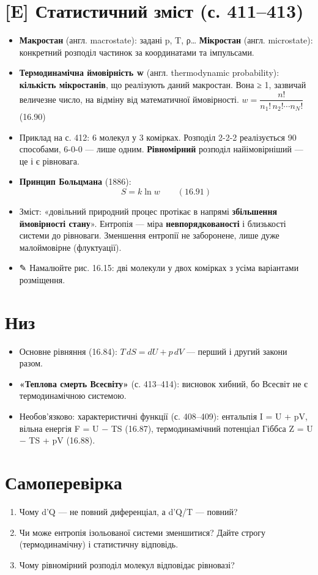 \documentclass[11pt,a4paper,oneside]{book}
\newcommand{\pen}{{\sffamily\color{accent}✎}}
\begin{document}
\section*{[E] Статистичний зміст (с. 411–413)}
\begin{itemize}
\item \textbf{Макростан} (англ. macrostate): задані p, T, ρ… \textbf{Мікростан} (англ. microstate): конкретний розподіл частинок за координатами та імпульсами.
\item \textbf{Термодинамічна ймовірність w} (англ. thermodynamic probability): \textbf{кількість мікростанів}, що реалізують даний макростан. Вона ≥ 1, зазвичай величезне число, на відміну від математичної ймовірності. $w = \dfrac{n!}{n_1!\,n_2!\cdots n_N!}$ (16.90)
\item Приклад на с. 412: 6 молекул у 3 комірках. Розподіл 2-2-2 реалізується 90 способами, 6-0-0 — лише одним. \textbf{Рівномірний} розподіл найімовірніший — це і є рівновага.
\item \textbf{Принцип Больцмана} (1886):
\[S = k\ln w\qquad(16.91)\]
\item Зміст: «довільний природний процес протікає в напрямі \textbf{збільшення ймовірності стану}». Ентропія — міра \textbf{невпорядкованості} і близькості системи до рівноваги. Зменшення ентропії не заборонене, лише дуже малоймовірне (флуктуації).
\item \pen{} Намалюйте рис. 16.15: дві молекули у двох комірках з усіма варіантами розміщення.
\end{itemize}

\section*{Низ}
\begin{itemize}
\item Основне рівняння (16.84): $T\,dS = dU + p\,dV$ — перший і другий закони разом.
\item \textbf{«Теплова смерть Всесвіту»} (с. 413–414): висновок хибний, бо Всесвіт не є термодинамічною системою.
\item Необов'язково: характеристичні функції (с. 408–409): ентальпія I = U + pV, вільна енергія F = U − TS (16.87), термодинамічний потенціал Гіббса Z = U − TS + pV (16.88).
\end{itemize}

\section*{Самоперевірка}
\begin{enumerate}
\item Чому d'Q — не повний диференціал, а d'Q/T — повний?
\item Чи може ентропія ізольованої системи зменшитися? Дайте строгу (термодинамічну) і статистичну відповідь.
\item Чому рівномірний розподіл молекул відповідає рівновазі?
\end{enumerate}
\end{document}

